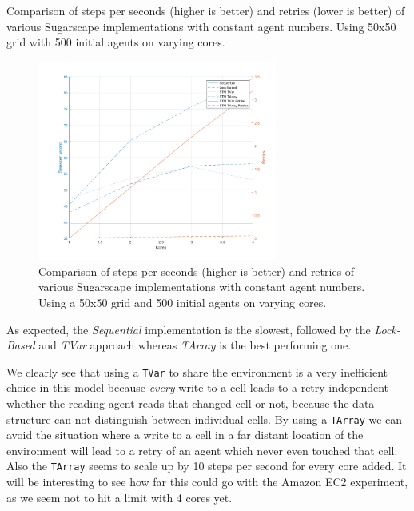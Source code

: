 \begin{table}
  	\caption[Comparison of steps per seconds and retries of various Sugarscape implementations with constant agent numbers]{Comparison of steps per seconds (higher is better) and retries (lower is better) of various Sugarscape implementations with constant agent numbers. Using 50x50 grid with 500 initial agents on varying cores.}
	\label{tab:varying_cores}
\end{table}

\begin{figure}
	\centering
	\includegraphics[width=0.7\textwidth, angle=0]{./fig/concurrentabs/sugarscape/varying_cores.png}
	\caption[Comparison of steps per seconds and retries of various Sugarscape implementations with constant agent numbers]{Comparison of steps per seconds (higher is better) and retries of various Sugarscape implementations with constant agent numbers. Using a 50x50 grid and 500 initial agents on varying cores.}
	\label{fig:varying_cores}
\end{figure}

As expected, the \textit{Sequential} implementation is the slowest, followed by the \textit{Lock-Based} and \textit{TVar} approach whereas \textit{TArray} is the best performing one.

We clearly see that using a \texttt{TVar} to share the environment is a very inefficient choice in this model because \textit{every} write to a cell leads to a retry independent whether the reading agent reads that changed cell or not, because the data structure can not distinguish between individual cells. By using a \texttt{TArray} we can avoid the situation where a write to a cell in a far distant location of the environment will lead to a retry of an agent which never even touched that cell. Also the \texttt{TArray} seems to scale up by 10 steps per second for every core added. It will be interesting to see how far this could go with the Amazon EC2 experiment, as we seem not to hit a limit with 4 cores yet.

